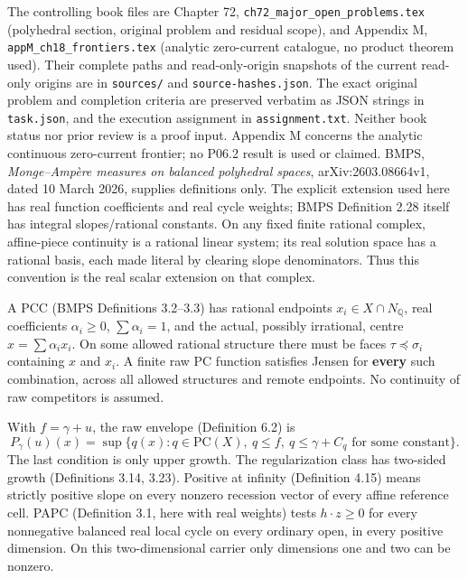 \documentclass[
  11pt,
]{article}
\begin{document}
The controlling book files are Chapter 72,
\texttt{ch72\_major\_open\_problems.tex} (polyhedral section, original
problem and residual scope), and Appendix M,
\texttt{appM\_ch18\_frontiers.tex} (analytic zero-current catalogue, no
product theorem used). Their complete paths and read-only-origin
snapshots of the current read-only origins are in \texttt{sources/} and
\texttt{source-hashes.json}. The exact original problem and completion
criteria are preserved verbatim as JSON strings in \texttt{task.json},
and the execution assignment in \texttt{assignment.txt}. Neither book
status nor prior review is a proof input. Appendix M concerns the
analytic continuous zero-current frontier; no P06.2 result is used or
claimed. BMPS, \emph{Monge--Ampère measures on balanced polyhedral
spaces}, arXiv:2603.08664v1, dated 10 March 2026, supplies definitions
only. The explicit extension used here has real function coefficients
and real cycle weights; BMPS Definition 2.28 itself has integral
slopes/rational constants. On any fixed finite rational complex,
affine-piece continuity is a rational linear system; its real solution
space has a rational basis, each made literal by clearing slope
denominators. Thus this convention is the real scalar extension on that
complex.

A PCC (BMPS Definitions 3.2--3.3) has rational endpoints
\(x_i\in X\cap N_{\mathbb{Q}}\), real coefficients \(\alpha_i\geq0\),
\(\sum\alpha_i=1\), and the actual, possibly irrational, centre
\(x=\sum\alpha_i x_i\). On some allowed rational structure there must be
faces \(\tau\preceq\sigma_i\) containing \(x\) and \(x_i\). A finite raw
PC function satisfies Jensen for \textbf{every} such combination, across
all allowed structures and remote endpoints. No continuity of raw
competitors is assumed.

With \(f=\gamma+u\), the raw envelope (Definition 6.2) is \[
 P_\gamma(u)(x)=\sup\{q(x):q\in\mathrm{PC}(X),\ q\leq f,
                          \ q\leq\gamma+C_q\text{ for some constant}\}.
                                                               \tag{4}
\] The last condition is only upper growth. The regularization class has
two-sided growth (Definitions 3.14, 3.23). Positive at infinity
(Definition 4.15) means strictly positive slope on every nonzero
recession vector of every affine reference cell. PAPC (Definition 3.1,
here with real weights) tests \(h\cdot z\geq0\) for every nonnegative
balanced real local cycle on every ordinary open, in every positive
dimension. On this two-dimensional carrier only dimensions one and two
can be nonzero.
\end{document}
